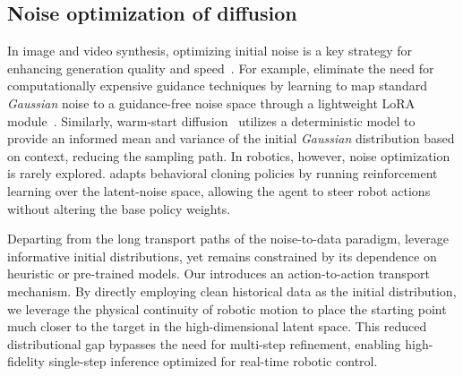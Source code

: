 \subsection{Noise optimization of diffusion}

In image and video synthesis, optimizing initial noise is a key strategy for enhancing generation quality and speed~\citep{ahn2024noise,mao2024lottery,samuel2024generating,eyring2024reno, warmstarts}. For example, \citet{ahn2024noise} eliminate the need for computationally expensive guidance techniques by learning to map standard \textit{Gaussian} noise to a guidance-free noise space through a lightweight LoRA module~\citep{hu2022lora}. Similarly, warm-start diffusion~\citep{warmstarts} utilizes a deterministic model to provide an informed mean and variance of the initial \textit{Gaussian} distribution based on context, reducing the sampling path. In robotics, however, noise optimization is rarely explored. \citet{steeringdp} adapts behavioral cloning policies by running reinforcement learning over the latent-noise space, allowing the agent to steer robot actions without altering the base policy weights.

Departing from the long transport paths of the noise-to-data paradigm, \citet{chen2024bridger} leverage informative initial distributions, yet remains constrained by its dependence on heuristic or pre-trained models. Our \m{} introduces an action-to-action transport mechanism. By directly employing clean historical data as the initial distribution, we leverage the physical continuity of robotic motion to place the starting point much closer to the target in the high-dimensional latent space. This reduced distributional gap bypasses the need for multi-step refinement, enabling high-fidelity single-step inference optimized for real-time robotic control. 